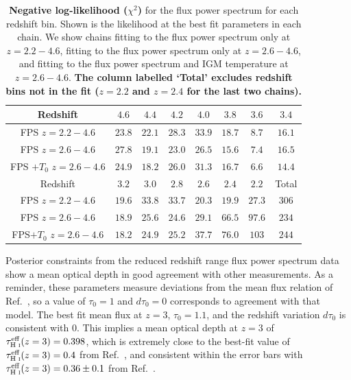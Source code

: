 \begin{table}
	\centering
     \def\arraystretch{1.2}
     \begin{tabular}{|c|c|c|c|c|c|c|c|}
		\hline
		Redshift & $4.6$ & $4.4$ & $4.2$ & $4.0$ & $3.8$ & $3.6$ & $3.4$\\
		\hline
        FPS $z= 2.2-4.6$ & $23.8$ & $22.1$ & $28.3$ & $33.9$ & $18.7$ & $8.7$ & $16.1$ \\
        FPS $z= 2.6-4.6$ & $27.8$ & $19.1$ & $23.0$ & $26.5$ & $15.6$ & $7.4$ & $16.5$\\
        FPS $+ T_0$ $z= 2.6-4.6$ & $24.9$ & $18.2$ & $26.0$ & $31.3$ & $16.7$ & $6.6$ & $14.4$ \\
        \hline
        Redshift & $3.2$ & $3.0$ & $2.8$ & $2.6$ & $2.4$ & $2.2$ & Total \\
		\hline
        FPS $z= 2.2-4.6$ & $19.6$ & $33.8$ & $33.7$ & $20.3$ & $19.9$ & $27.3$ & $306$ \\
        FPS $z= 2.6-4.6$ & $18.9$ & $25.6$ & $24.6$ & $29.1$ & $66.5$ & $97.6$ & $234$ \\
        FPS$ + T_0$ $z= 2.6-4.6$ & $18.2$ & $24.9$ & $25.2$ & $37.7$ & $76.0$ & $103$ & $244$\\
  \hline
	\end{tabular}
    \caption{\label{table:chi2}
    \textbf{Negative log-likelihood ($\chi^2$)} for the flux power spectrum for each redshift bin.
    Shown is the likelihood at the best fit parameters in each chain.
    We show chains fitting to the flux power spectrum only at $z=2.2-4.6$, fitting to the flux power spectrum only at $z=2.6-4.6$, and fitting to the flux power spectrum and IGM temperature at $z=2.6-4.6$.
    \textbf{The column labelled `Total' excludes redshift bins not in the fit ($z=2.2$ and $z=2.4$ for the last two chains).}
    }
\end{table}

Posterior constraints from the reduced redshift range flux power spectrum data show a mean optical depth in good agreement with other measurements.
As a reminder, these parameters measure deviations from the mean flux relation of Ref.~\cite{2007MNRAS.382.1657K}, so a value of $\tau_0=1$ and $d\tau_0=0$ corresponds to agreement with that model.
The best fit mean flux at $z=3$, $\tau_0 = 1.1$, and the redshift variation $d\tau_0$ is consistent with $0$.
This implies a mean optical depth at $z=3$ of $\tau^{\text{eff}}_{\text{H~{\sc i}}}(z=3) = 0.398$, which is extremely close to the best-fit value of $\tau^{\text{eff}}_{\text{H~{\sc i}}}(z=3) = 0.4$ from Ref.~\cite{2013MNRAS.430.2067B}, and consistent within the error bars with $\tau^{\text{eff}}_{\text{H~{\sc i}}}(z=3) = 0.36 \pm 0.1$ from Ref.~\cite{2007MNRAS.382.1657K}. 

